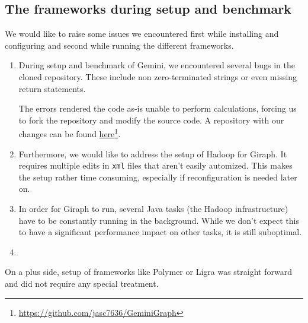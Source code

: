 

\subsection{The frameworks during setup and benchmark}
We would like to raise some issues we encountered first while installing and configuring and second while running the different frameworks.

\begin{enumerate}
	\item During setup and benchmark of Gemini, we encountered several bugs in the cloned repository. These include non zero-terminated strings or even missing return statements.

	The errors rendered the code as-is unable to perform calculations, forcing us to fork the repository and modify the source code. A repository with our changes can be found \href{https://github.com/jasc7636/GeminiGraph}{here}\footnote{\url{https://github.com/jasc7636/GeminiGraph}}.

	\item Furthermore, we would like to address the setup of Hadoop for Giraph. It requires multiple edits in \texttt{xml} files that aren't easily automized. This makes the setup rather time consuming, especially if reconfiguration is needed later on.
	\item In order for Giraph to run, several Java tasks (the Hadoop infrastructure) have to be constantly running in the background. While we don't expect this to have a significant performance impact on other tasks, it is still suboptimal.

	\item 
\end{enumerate}


On a plus side, setup of frameworks like Polymer or Ligra was straight forward and did not require any special treatment. 



\clearpage





